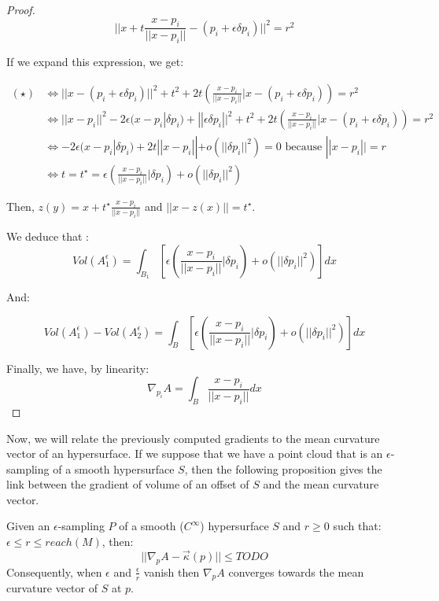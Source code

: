 \begin{proof}
\begin{equation}
    || x + t \frac{x - p_i}{||x - p_i||} - (p_i + \epsilon \delta p_i) ||^2 = r^2
    \tag{$\star$}
\end{equation}

If we expand this expression, we get:

\begin{align*}
    (\star) & \iff || x - (p_i + \epsilon \delta p_i) ||^2 + t^2 + 2t \left(
        \frac{x-p_i}{|| x - p_i||} | x - (p_i + \epsilon \delta p_i) \right) = r^2 \\
    & \iff || x - p_i || ^2 - 2 \epsilon (x - p_i | \delta p_i) + || \epsilon \delta p_i || ^2 + t^2 + 2t
    \left( \frac{x-p_i}{|| x - p_i||} | x - (p_i + \epsilon \delta p_i) \right) = r^2 \\
    & \iff -2 \epsilon (x - p_i | \delta p_i) + 2t || x - p_i|| + o(||\delta p_i||^2) = 0
    \text{ because } || x - p_i || = r \\
    & \iff t = t^{\star} = \epsilon \left( \frac{x - p_i}{||x - p_i||} | \delta p_i \right) +
    o(||\delta p_i||^2)
\end{align*}

Then, $ z(y) = x + t^{\star} \frac{x - p_i}{||x - p_i||} $ and $ || x - z(x) || =
t^{\star} $.

We deduce that :
$$ Vol(A_1^\epsilon) = \int_{B_1} \left[ \epsilon \left( \frac{x - p_i}{||x - p_i||} | \delta p_i \right) +
o(||\delta p_i||^2) \right] dx $$

And:

$$ Vol(A_1^\epsilon) - Vol(A_2^\epsilon) = \int_{B} \left[ \epsilon \left( \frac{x - p_i}{||x - p_i||} | \delta p_i \right)
+ o(||\delta p_i||^2) \right] dx $$

Finally, we have, by linearity:
$$ \nabla_{p_i} A = \int_{B} \frac{x - p_i}{||x - p_i||} dx $$

\end{proof}

Now, we will relate the previously computed gradients to the mean curvature
vector of an hypersurface. If we suppose that we have a point cloud that is an
$\epsilon$-sampling of a smooth hypersurface $ S $, then the following
proposition gives the link between the gradient of volume of an offset of $ S $
and the mean curvature vector.

\begin{proposition}
    \label{prop:gradient-mean-curvature}
    Given an $\epsilon$-sampling $ P $ of a smooth ($ C^{\infty} $) hypersurface
    $ S $ and $ r \ge 0 $ such that: $ \epsilon \leq r \leq reach(M) $, then:
    $$ || \nabla_p A - \vec{\kappa}(p) || \leq TODO $$
    Consequently, when $ \epsilon $ and $ \frac{\epsilon}{r} $ vanish then
    $ \nabla_p A $ converges towards the mean curvature vector of $ S $ at $ p $.
\end{proposition}

